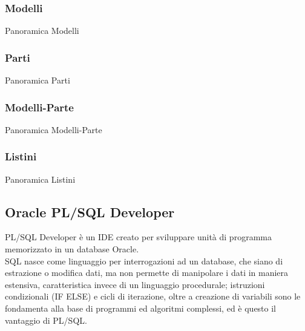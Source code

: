 \subsubsection{Modelli}
Panoramica Modelli
\subsubsection{Parti}
Panoramica Parti
\subsubsection{Modelli-Parte}
Panoramica Modelli-Parte
\subsubsection{Listini}
Panoramica Listini


\subsection{Oracle PL/SQL Developer}
PL/SQL Developer è un IDE creato per sviluppare unità di programma memorizzato in un database Oracle.\\
SQL nasce come linguaggio per interrogazioni ad un database, che siano di estrazione o modifica dati, ma non permette di manipolare i dati in maniera estensiva, caratteristica invece di un linguaggio procedurale; istruzioni condizionali (IF ELSE) e cicli di iterazione, oltre a creazione di variabili sono le fondamenta alla base di programmi ed algoritmi complessi, ed è questo il vantaggio di PL/SQL.\\
